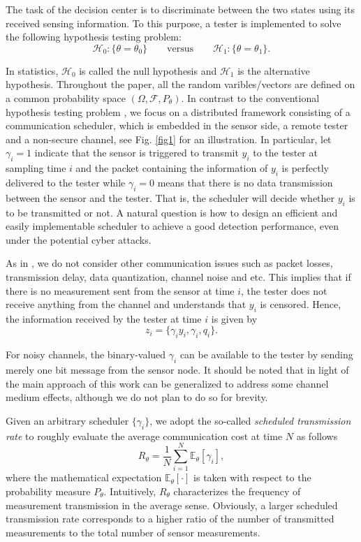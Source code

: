 \documentclass[journal]{IEEEtran}
\def\bE{\mathbb{E}}
\def\cH{\mathcal{H}}
\def\bee{\begin{equation}}
\def\ene{\end{equation}}
\begin{document}
The task of the decision center is to discriminate between the two states using its received sensing information. To this purpose, a tester is implemented to solve the following hypothesis testing problem:
\bee
\label{prb_test}
\cH_{0}:\{\theta=\theta_{0}\}\quad\quad \text{versus}\quad\quad \cH_{1}:\{\theta=\theta_{1}\}.
\ene

In statistics, $\cH_0$ is called the null hypothesis and $\cH_1$ is the alternative hypothesis. Throughout the paper, all the random varibles/vectors are defined on a common probability space $(\Omega,\mathcal{F},P_\theta)$. In contrast to the conventional hypothesis testing problem \cite{casella2001statistical}, we focus on a distributed framework consisting of a communication scheduler, which is embedded in the sensor side,
a remote tester and a non-secure channel, see Fig. \ref{fig1} for an illustration. In particular, let $\gamma_{i}=1$ indicate that the sensor is triggered to transmit $y_i$ to the tester at sampling time $i$ and the packet containing the information of $y_{i}$ is perfectly delivered to the tester while $\gamma_{i}=0$ means that there is no data transmission between the sensor and the tester. That is, the scheduler will decide whether $y_{i}$ is to be transmitted or not. A natural question is how to design an efficient and easily implementable scheduler to achieve a good detection performance, even under the potential cyber attacks.



As in \cite{you2013kalman}, we do not consider other communication issues such as packet losses, transmission delay, data quantization, channel noise and etc. This implies that if there is no measurement sent from the sensor at time $i$, the tester does not receive anything from the channel and understands that $y_i$ is censored. Hence, the  information received by the tester at time $i$ is given by
\begin{equation}
z_{i}=\{\gamma_{i}y_{i},\gamma_{i}, q_i\}.
\end{equation}

For noisy channels, the binary-valued $\gamma_i$ can be available to the tester by sending merely one bit message from the sensor node. It should be noted that in light of \cite{you2013asymptotically} the main approach of this work can be generalized to address some channel medium effects, although we do not plan to do so for brevity.


Given an arbitrary scheduler $\{\gamma_i\}$, we adopt the so-called {\em scheduled transmission rate}\cite{you2013asymptotically} to roughly evaluate the average communication cost at time $N$ as follows
\begin{equation}\label{schedulerrate}
R_{\theta}=\frac{1}{N}\sum_{i=1}^{N}\mathbb{E}_{\theta}[\gamma_{i}],
\end{equation}
where the mathematical expectation $\bE_\theta[\cdot]$ is taken with respect to the probability measure $P_\theta$.
Intuitively, $R_\theta$ characterizes the frequency of measurement transmission in the average sense. Obviously, a larger scheduled transmission rate corresponds to a higher ratio of the number of transmitted measurements to the total number of sensor measurements.
\end{document}
